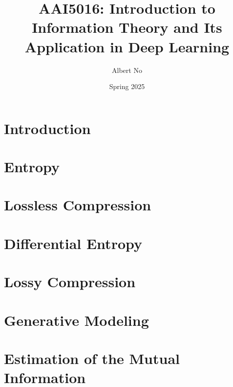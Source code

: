 \documentclass{article}
\title{AAI5016: Introduction to Information Theory and Its Application in Deep Learning}
\author{Albert No}
\date{Spring 2025}
\numberwithin{equation}{section}
\begin{document}
\maketitle
\tableofcontents
\newpage

\section{Introduction}



\section{Entropy}


\section{Lossless Compression}


\section{Differential Entropy}


\section{Lossy Compression}


\section{Generative Modeling}


\section{Estimation of the Mutual Information}

\end{document}
